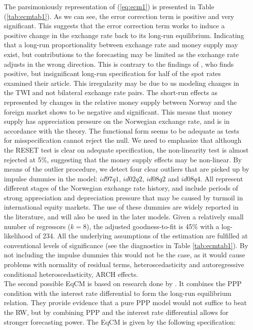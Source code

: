 \documentclass[10pt]{article}
\numberwithin{equation}{section}
\numberwithin{table}{section}
\numberwithin{figure}{section}
\begin{document}
\begin{spacing}{1.5}
\indent The parsimoniously representation of (\ref{eq:ecm1}) is presented in Table (\ref{tab:ecmtab1}). As we can see, the error correction term is positive and very significant. This suggests that the error correction term works to induce a positive change in the exchange rate back to its long-run equilibrium. Indicating that a long-run proportionality between exchange rate and money supply may exist, but contributions to the forecasting may be limited as the exchange rate adjusts in the wrong direction. This is contrary to the findings of \cite{reinton1999out}, who finds positive, but insignificant long-run specification for half of the spot rates examined their article. This irregularity may be due to us modeling changes in the TWI and not bilateral exchange rate pairs. The short-run effects as represented by changes in the relative money supply between Norway and the foreign market shows to be negative and significant. This means that money supply has appreciation pressure on the Norwegian exchange rate, and is in accordance with the theory. The functional form seems to be adequate as tests for misspecification cannot reject the null. We need to emphasize that although the RESET test is clear on adequate specification, the non-linearity test \citep{saikkonen1988lagrange} is almost rejected at 5\%, suggesting that the money supply effects may be non-linear. By means of the outlier procedure, we detect four clear outliers that are picked up by impulse dummies in the model: $id97q1$, $id02q2$, $id08q2$ and $id08q4$. All represent different stages of the Norwegian exchange rate history, and include periods of strong appreciation and depreciation pressure that may be caused by turmoil in international equity markets. The use of these dummies are widely reported in the literature, and will also be used in the later models. Given a relatively small number of regressors ($k = 8$), the adjusted goodness-to-fit is 45\% with a log-likelihood of 234. All the underlying assumptions of the estimation are fulfilled at conventional levels of significance (see the diagnostics in Table \ref{tab:ecmtab1}). By not including the impulse dummies this would not be the case, as it would cause problems with normality of residual terms, heteroscedasticity and autoregressive conditional heteroscedasticity, ARCH effects.\\
\indent The second possible EqCM is based on research done by \cite{bjornland2006importance}. It combines the PPP condition with the interest rate differential to form the long-run equilibrium relation. They provide evidence that a pure PPP model would not suffice to beat the RW, but by combining PPP and the interest rate differential allows for stronger forecasting power. The EqCM is given by the following specification:

\end{spacing}
\end{document}
